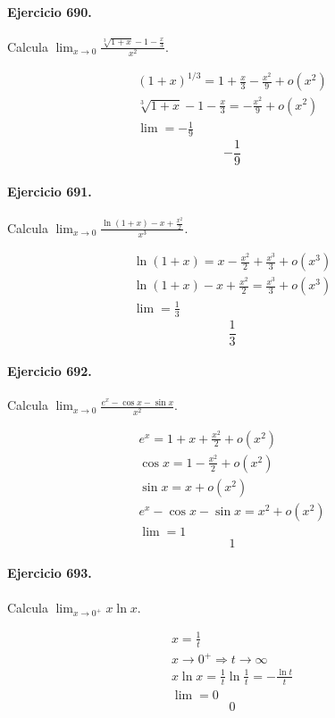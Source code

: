 \documentclass[11pt,a4paper]{article}
\begin{document}
\paragraph{Ejercicio 690.} Calcula $\displaystyle \lim_{x\to0}\frac{\sqrt[3]{1+x}-1-\frac{x}{3}}{x^2}$.

\[
\begin{aligned}
(1+x)^{1/3}=1+\frac{x}{3}-\frac{x^2}{9}+o(x^2)\\
\sqrt[3]{1+x}-1-\frac{x}{3}=-\frac{x^2}{9}+o(x^2)\\
\lim=-\frac19
\end{aligned}
\]
\[\boxed{-\frac19}\]


\paragraph{Ejercicio 691.} Calcula $\displaystyle \lim_{x\to0}\frac{\ln(1+x)-x+\frac{x^2}{2}}{x^3}$.

\[
\begin{aligned}
\ln(1+x)=x-\frac{x^2}{2}+\frac{x^3}{3}+o(x^3)\\
\ln(1+x)-x+\frac{x^2}{2}=\frac{x^3}{3}+o(x^3)\\
\lim=\frac13
\end{aligned}
\]
\[\boxed{\frac13}\]


\paragraph{Ejercicio 692.} Calcula $\displaystyle \lim_{x\to0}\frac{e^x-\cos x-\sin x}{x^2}$.

\[
\begin{aligned}
e^x=1+x+\frac{x^2}{2}+o(x^2)\\
\cos x=1-\frac{x^2}{2}+o(x^2)\\
\sin x=x+o(x^2)\\
e^x-\cos x-\sin x=x^2+o(x^2)\\
\lim=1
\end{aligned}
\]
\[\boxed{1}\]


\paragraph{Ejercicio 693.} Calcula $\displaystyle \lim_{x\to0^+}x\ln x$.

\[
\begin{aligned}
x=\frac1t\\
x\to0^+\Rightarrow t\to\infty\\
x\ln x=\frac1t\ln\frac1t=-\frac{\ln t}{t}\\
\lim=0
\end{aligned}
\]
\[\boxed{0}\]
\end{document}
